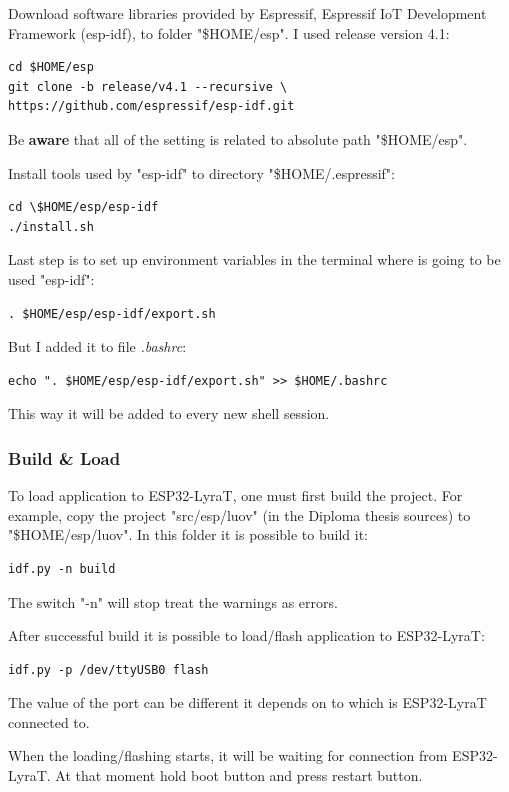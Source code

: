 \documentclass[thesis=M,english]{FITthesis}[2019/12/23]
\begin{document}
\bigskip
\noindent
Download software libraries provided by Espressif, Espressif IoT Development Framework (esp-idf), to folder "\$HOME/esp". I used release version 4.1:
\begin{lstlisting}[frame=single]
cd $HOME/esp
git clone -b release/v4.1 --recursive \
https://github.com/espressif/esp-idf.git
\end{lstlisting}
Be \textbf{aware} that all of the setting is related to absolute path "\$HOME/esp". 

\bigskip
\noindent
Install tools used by "esp-idf" to directory "\$HOME/.espressif":
\begin{lstlisting}[frame=single]
cd \$HOME/esp/esp-idf
./install.sh
\end{lstlisting}

\bigskip
\noindent
Last step is to set up environment variables in the terminal where is going to be used "esp-idf":
\begin{lstlisting}[frame=single]
. $HOME/esp/esp-idf/export.sh
\end{lstlisting}
But I added it to file \textit{.bashrc}:
\begin{lstlisting}[frame=single]
echo ". $HOME/esp/esp-idf/export.sh" >> $HOME/.bashrc
\end{lstlisting}
This way it will be added to every new shell session.

\subsubsection{Build \& Load}
To load application to ESP32-LyraT, one must first build the project. For example, copy the project "src/esp/luov" (in the Diploma thesis sources) to "\$HOME/esp/luov". In this folder it is possible to build it:
\begin{lstlisting}[frame=single]
idf.py -n build
\end{lstlisting}
The switch "-n" will stop treat the warnings as errors.

\bigskip
\noindent
After successful build it is possible to load/flash application to ESP32-LyraT:
\begin{lstlisting}[frame=single]
idf.py -p /dev/ttyUSB0 flash
\end{lstlisting}
The value of the port can be different it depends on to which is ESP32-LyraT connected to.

\bigskip
\noindent
When the loading/flashing starts, it will be waiting for connection from ESP32-LyraT. At that moment hold boot button and press restart button.
\end{document}
